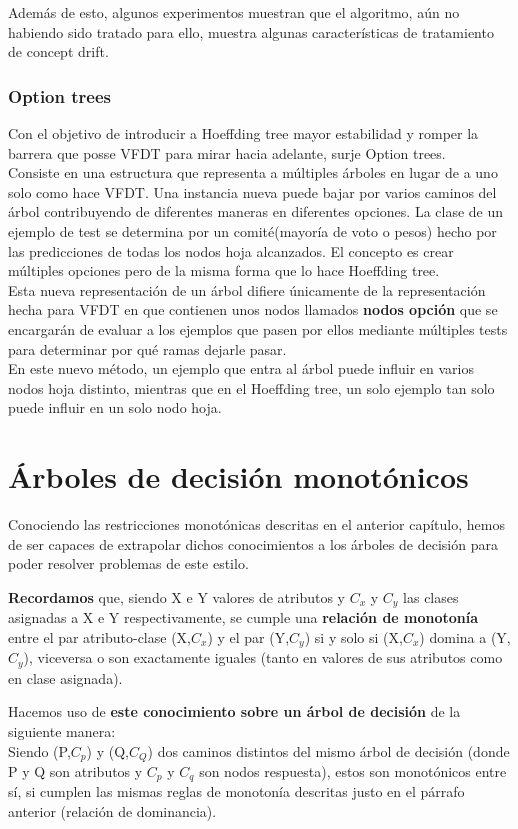 Además de esto, algunos experimentos muestran que el algoritmo, aún no habiendo sido tratado para ello, muestra algunas características de tratamiento de concept drift.

\subsubsection{Option trees}

Con el objetivo de introducir a Hoeffding tree mayor estabilidad y romper la barrera que posse VFDT para mirar hacia adelante, surje Option trees\cite{ref13}.\\
Consiste en una estructura que representa a múltiples árboles en lugar de a uno solo como hace VFDT. Una instancia nueva puede bajar por varios caminos del árbol contribuyendo de diferentes maneras en diferentes opciones. La clase de un ejemplo de test se determina por un comité(mayoría de voto o pesos) hecho por las predicciones de todas los nodos hoja alcanzados. El concepto es crear múltiples opciones pero de la misma forma que lo hace Hoeffding tree.\\
Esta nueva representación de un árbol difiere únicamente de la representación hecha para VFDT en que contienen unos nodos llamados \textbf{nodos opción} que se encargarán de evaluar a los ejemplos que pasen por ellos mediante múltiples tests para determinar por qué ramas dejarle pasar.\\
En este nuevo método, un ejemplo que entra al árbol puede influir en varios nodos hoja distinto, mientras que en el Hoeffding tree, un solo ejemplo tan solo puede influir en un solo nodo hoja.

\section{Árboles de decisión monotónicos}

Conociendo las restricciones monotónicas descritas en el anterior capítulo, hemos de ser capaces de extrapolar dichos conocimientos a los árboles de decisión para poder resolver problemas de este estilo.

\textbf{Recordamos} que, siendo X e Y valores de atributos y $C_x$ y $C_y$ las clases asignadas a X e Y respectivamente, se cumple una \textbf{relación de monotonía} entre el par atributo-clase (X,$C_x$) y el par (Y,$C_y$) si y solo si (X,$C_x$) domina a (Y,$C_y$), viceversa o son exactamente iguales (tanto en valores de sus atributos como en clase asignada).

Hacemos uso de \textbf{este conocimiento sobre un árbol de decisión} de la siguiente manera:\\
Siendo (P,$C_p$) y (Q,$C_Q$) dos caminos distintos del mismo árbol de decisión (donde P y Q son atributos y $C_p$ y $C_q$ son nodos respuesta), estos son monotónicos entre sí, si cumplen las mismas reglas de monotonía descritas justo en el párrafo anterior (relación de dominancia).\cite{ref14}

